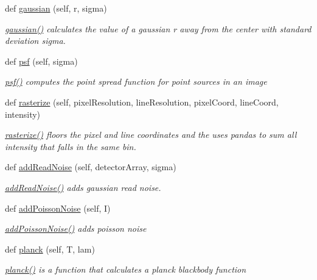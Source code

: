 \begin{DoxyCompactItemize}
def \hyperlink{classcamera_1_1image_a8221ae614b180710c72f2675838939b2}{gaussian} (self, r, sigma)
\begin{DoxyCompactList}\small\item\em \hyperlink{classcamera_1_1image_a8221ae614b180710c72f2675838939b2}{gaussian()} calculates the value of a gaussian r away from the center with standard deviation sigma. \end{DoxyCompactList}\item 
def \hyperlink{classcamera_1_1image_a20565a1c8ab7898a047e45ca6edf2b1b}{psf} (self, sigma)
\begin{DoxyCompactList}\small\item\em \hyperlink{classcamera_1_1image_a20565a1c8ab7898a047e45ca6edf2b1b}{psf()} computes the point spread function for point sources in an image \end{DoxyCompactList}\item 
def \hyperlink{classcamera_1_1image_ac6c6e628859396da903359da425f8fbb}{rasterize} (self, pixel\+Resolution, line\+Resolution, pixel\+Coord, line\+Coord, intensity)
\begin{DoxyCompactList}\small\item\em \hyperlink{classcamera_1_1image_ac6c6e628859396da903359da425f8fbb}{rasterize()} floors the pixel and line coordinates and the uses pandas to sum all intensity that falls in the same bin. \end{DoxyCompactList}\item 
def \hyperlink{classcamera_1_1image_a050f22f120276a1833ac650dbe9d3584}{add\+Read\+Noise} (self, detector\+Array, sigma)
\begin{DoxyCompactList}\small\item\em \hyperlink{classcamera_1_1image_a050f22f120276a1833ac650dbe9d3584}{add\+Read\+Noise()} adds gaussian read noise. \end{DoxyCompactList}\item 
def \hyperlink{classcamera_1_1image_aedd03c3f51edba0e50a4ae231498a503}{add\+Poisson\+Noise} (self, I)
\begin{DoxyCompactList}\small\item\em \hyperlink{classcamera_1_1image_aedd03c3f51edba0e50a4ae231498a503}{add\+Poisson\+Noise()} adds poisson noise \end{DoxyCompactList}\item 
def \hyperlink{classcamera_1_1image_a9ea76ebff6206130cfbbe8e45fcf0ca6}{planck} (self, T, lam)
\begin{DoxyCompactList}\small\item\em \hyperlink{classcamera_1_1image_a9ea76ebff6206130cfbbe8e45fcf0ca6}{planck()} is a function that calculates a planck blackbody function \end{DoxyCompactList}\item 

\end{DoxyCompactItemize}

